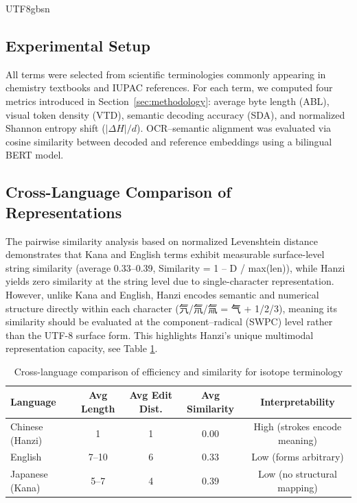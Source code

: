 \documentclass[conference]{IEEEtran}
\begin{document}
\begin{CJK*}{UTF8}{gbsn}
\subsection{Experimental Setup}

All terms were selected from scientific terminologies commonly appearing in chemistry textbooks and IUPAC references.  
For each term, we computed four metrics introduced in Section~\ref{sec:methodology}:  
average byte length (ABL), visual token density (VTD), semantic decoding accuracy (SDA), and normalized Shannon entropy shift ($|\Delta H|/d$).  
OCR–semantic alignment was evaluated via cosine similarity between decoded and reference embeddings using a bilingual BERT model.

\subsection{Cross-Language Comparison of Representations}
The pairwise similarity analysis based on normalized Levenshtein distance
demonstrates that Kana and English terms exhibit measurable surface-level
string similarity (average 0.33–0.39, Similarity = 1 – D / max(len)), while Hanzi yields zero similarity at the
string level due to single-character representation. However, unlike Kana and
English, Hanzi encodes semantic and numerical structure directly within each
character (氕/氘/氚 = 气 + 1/2/3), meaning its similarity should be evaluated
at the component–radical (SWPC) level rather than the UTF-8 surface form.
This highlights Hanzi's unique multimodal representation capacity, see Table \ref{tab:language_comparison}.

\begin{table}[h!]
\centering
\caption{Cross-language comparison of efficiency and similarity for isotope terminology}
\label{tab:language_comparison}
\begin{tabular}{lcccc}
\hline
\textbf{Language} & \textbf{Avg Length} & \textbf{Avg Edit Dist.} & \textbf{Avg Similarity} & \textbf{Interpretability} \\
\hline
Chinese (Hanzi) & 1 & 1 & 0.00 & High (strokes encode meaning) \\
English & 7--10 & 6 & 0.33 & Low (forms arbitrary) \\
Japanese (Kana) & 5--7 & 4 & 0.39 & Low (no structural mapping) \\
\hline
\end{tabular}
\end{table}


\end{CJK*}
\end{document}
